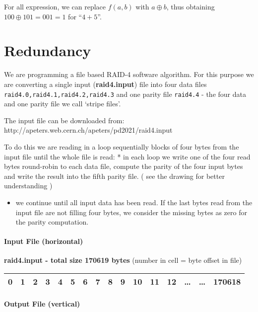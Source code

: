 \documentclass[11pt]{article}
\providecommand{\tightlist}{%
      \setlength{\itemsep}{0pt}\setlength{\parskip}{0pt}}
\begin{document}
For all expression, we can replace \(f(a,b)\) with \(a\oplus b\), thus
obtaining \(100\oplus 101 = 001 = 1\) for ``\(4+5\)''.

    \hypertarget{redundancy}{%
\section{Redundancy}\label{redundancy}}

We are programming a file based RAID-4 software algorithm. For this
purpose we are converting a single input (\textbf{raid4.input}) file
into four data files \texttt{raid4.0,raid4.1,raid4.2,raid4.3} and one
parity file \texttt{raid4.4} - the four data and one parity file we call
`stripe files'.

The input file can be downloaded from:
http://apeters.web.cern.ch/apeters/pd2021/raid4.input

To do this we are reading in a loop sequentially blocks of four bytes
from the input file until the whole file is read: * in each loop we
write one of the four read bytes round-robin to each data file, compute
the parity of the four input bytes and write the result into the fifth
parity file. ( see the drawing for better understanding )

\begin{itemize}
\tightlist
\item
  we continue until all input data has been read. If the last bytes read
  from the input file are not filling four bytes, we consider the
  missing bytes as zero for the parity computation.
\end{itemize}

\hypertarget{input-file-horizontal}{%
\paragraph{Input File (horizontal)}\label{input-file-horizontal}}

\textbf{raid4.input - total size 170619 bytes} (number in cell = byte
offset in file)

\begin{longtable}[]{@{}llllllllllllllll@{}}
\toprule
0 & 1 & 2 & 3 & 4 & 5 & 6 & 7 & 8 & 9 & 10 & 11 & 12 & \ldots{} &
\ldots{} & 170618\tabularnewline
\midrule
\endhead
\bottomrule
\end{longtable}

\hypertarget{output-file-vertical}{%
\paragraph{Output File (vertical)}\label{output-file-vertical}}
\end{document}
